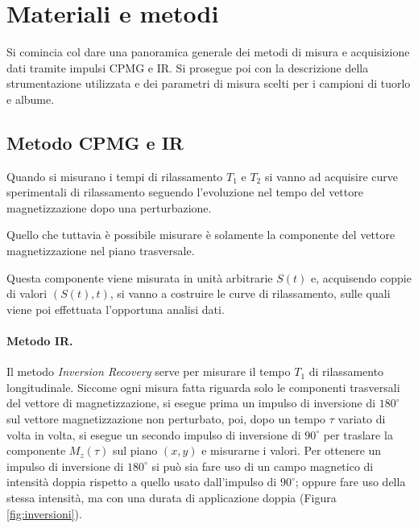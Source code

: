 \section*{Materiali e metodi}

Si comincia col dare una panoramica generale dei metodi di misura e acquisizione dati tramite impulsi CPMG e IR. Si prosegue poi con la descrizione della strumentazione utilizzata e dei parametri di misura scelti per i campioni di tuorlo e albume.

\subsection*{Metodo CPMG e IR}

Quando si misurano i tempi di rilassamento $T_1$ e $T_2$ si vanno ad acquisire curve sperimentali di rilassamento seguendo l'evoluzione nel tempo del vettore magnetizzazione dopo una perturbazione.

Quello che tuttavia è possibile misurare è solamente la componente del vettore magnetizzazione nel piano trasversale.

Questa componente viene misurata in unità arbitrarie $S(t)$ e, acquisendo coppie di valori $(S(t), t)$, si vanno a costruire le curve di rilassamento, sulle quali viene poi effettuata l'opportuna analisi dati.

\paragraph{Metodo IR.}

Il metodo \textit{Inversion Recovery} serve per misurare il tempo $T_1$ di rilassamento longitudinale. Siccome ogni misura fatta riguarda solo le componenti trasversali del vettore di magnetizzazione, si esegue prima un impulso di inversione di $180^{\circ}$ sul vettore magnetizzazione non perturbato, poi, dopo un tempo $\tau$ variato di volta in volta, si esegue un secondo impulso di inversione di $90^{\circ}$ per traslare la componente $M_z(\tau)$ sul piano $(x,y)$ e misurarne i valori. Per ottenere un impulso di inversione di $180^{\circ}$ si può sia fare uso di un campo magnetico di intensità doppia rispetto a quello usato dall'impulso di $90^{\circ}$; oppure fare uso della stessa intensità, ma con una durata di applicazione doppia (Figura \ref{fig:inversioni}).

